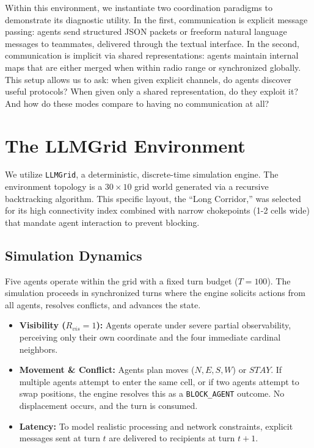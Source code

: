 \documentclass[10pt,twocolumn]{article}
\begin{document}
Within this environment, we instantiate two coordination paradigms to demonstrate its diagnostic utility. In the first, communication is explicit message passing: agents send structured JSON packets or freeform natural language messages to teammates, delivered through the textual interface. In the second, communication is implicit via shared representations: agents maintain internal maps that are either merged when within radio range or synchronized globally. This setup allows us to ask: when given explicit channels, do agents discover useful protocols? When given only a shared representation, do they exploit it? And how do these modes compare to having no communication at all?

\section{The LLMGrid Environment}

We utilize \texttt{LLMGrid}, a deterministic, discrete-time simulation engine. The environment topology is a $30 \times 10$ grid world generated via a recursive backtracking algorithm. This specific layout, the ``Long Corridor,'' was selected for its high connectivity index combined with narrow chokepoints (1-2 cells wide) that mandate agent interaction to prevent blocking.

\subsection{Simulation Dynamics}
Five agents operate within the grid with a fixed turn budget ($T=100$). The simulation proceeds in synchronized turns where the engine solicits actions from all agents, resolves conflicts, and advances the state.

\begin{itemize}
    \item \textbf{Visibility ($R_{vis}=1$):} Agents operate under severe partial observability, perceiving only their own coordinate and the four immediate cardinal neighbors.
    \item \textbf{Movement \& Conflict:} Agents plan moves ($N, E, S, W$) or $STAY$. If multiple agents attempt to enter the same cell, or if two agents attempt to swap positions, the engine resolves this as a \texttt{BLOCK\_AGENT} outcome. No displacement occurs, and the turn is consumed.
    \item \textbf{Latency:} To model realistic processing and network constraints, explicit messages sent at turn $t$ are delivered to recipients at turn $t+1$.
\end{itemize}
\end{document}
